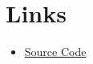 \documentclass[a4paper,10pt,oneside,openany]{sphinxmanual}
\begin{document}
\chapter{Links}
\label{index:links}\begin{itemize}
\item {} 
\href{https://github.com/ktoso/scala-words}{Source Code}

\end{itemize}



\renewcommand{\indexname}{Index}
\printindex
\end{document}
